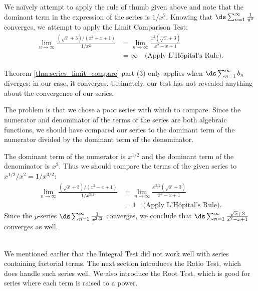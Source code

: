 {We na\"ively attempt to apply the rule of thumb given above and note that the dominant term in the expression of the series is $1/x^2$. Knowing that $\ds \sum_{n=1}^\infty \frac1{n^2}$ converges, we attempt to apply the Limit Comparison Test:
\begin{align*}
\lim_{n\to\infty}\frac{(\sqrt{x}+3)/(x^2-x+1)}{1/x^2} &= \lim_{n\to\infty}\frac{x^2(\sqrt x+3)}{x^2-x+1}\\
		&= \infty \quad \text{(Apply L'H\^opital's Rule)}.
\end{align*}

Theorem \ref{thm:series_limit_compare} part (3) only applies when $\ds\sum_{n=1}^\infty b_n$ diverges; in our case, it converges. Ultimately, our test has not revealed anything about the convergence of our series.

The problem is that we chose a poor series with which to compare. Since the numerator and denominator of the terms of the series are both algebraic functions, we should have compared our series  to the dominant term of the numerator divided by the dominant term of the denominator.

The dominant term of the numerator is $x^{1/2}$ and the dominant term of the denominator is $x^2$. Thus we should compare the terms of the given series to $x^{1/2}/x^2 = 1/x^{3/2}$:
\begin{align*}
\lim_{n\to\infty}\frac{(\sqrt{x}+3)/(x^2-x+1)}{1/x^{3/2}} &= \lim_{n\to \infty} \frac{x^{3/2}(\sqrt x+3)}{x^2-x+1} \\
		&= 1\quad \text{(Apply L'H\^opital's Rule)}.
\end{align*}
Since the  $p$-series $\ds\sum_{n=1}^\infty \frac1{x^{3/2}}$ converges, we conclude that $\ds\sum_{n=1}^\infty \frac{\sqrt{x}+3}{x^2-x+1}$ converges as well.
}\\

\enlargethispage{\baselineskip}
We mentioned earlier that the Integral Test did not work well with series containing factorial terms. The next section introduces the Ratio Test, which does handle such series well. We also introduce the Root Test, which is good for series where each term is raised to a power.

